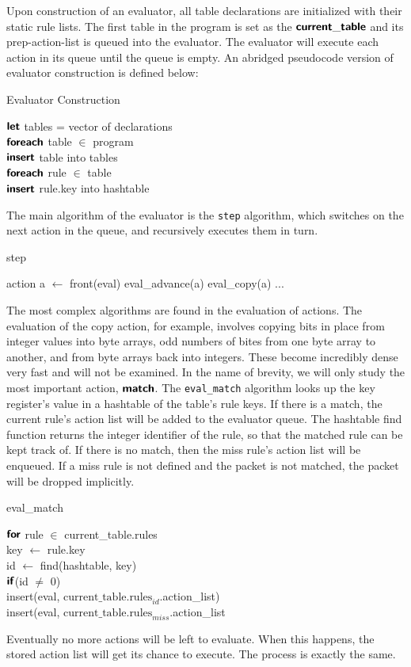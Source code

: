 Upon construction of an evaluator, all table declarations are initialized with their static rule lists. The first table in the program is set as the $\bm{\mathsf{{current\_table}}}$ and its prep-action-list is queued into the evaluator. The evaluator will execute each action in its queue until the queue is empty. An abridged pseudocode version of evaluator construction is defined below:
\begin{algorithm*}
\caption{Evaluator Construction}
$\bm{\mathsf{{let}}}$ tables = vector of declarations \\
$\bm{\mathsf{{foreach}}}$ table $\in$ program \\
\tab $\bm{\mathsf{{insert}}}$ table into tables \\
\tab $\bm{\mathsf{{foreach}}}$ rule $\in$ table \\
\tab\tab $\bm{\mathsf{{insert}}}$ rule.key into hashtable \\
\end{algorithm*}

The main algorithm of the evaluator is the \texttt{step} algorithm, which switches on the next action in the queue, and recursively executes them in turn.
\begin{algorithm}
\caption{step}
\begin{algorithmic}
  \State action a $\leftarrow$ front(eval)
    \Return eval\_advance(a)
    \Return eval\_copy(a)
  \EndIf
  \State ...
  \EndWhile
\end{algorithmic}
\end{algorithm}

The most complex algorithms are found in the evaluation of actions. The evaluation of the copy action, for example, involves copying bits in place from integer values into byte arrays, odd numbers of bites from one byte array to another, and from byte arrays back into integers. These become incredibly dense very fast and will not be examined. In the name of brevity, we will only study the most important action, $\bm{\mathsf{{match}}}$. The \texttt{eval\_match} algorithm looks up the key register's value in a hashtable of the table's rule keys. If there is a match, the current rule's action list will be added to the evaluator queue. The hashtable find function returns the integer identifier of the rule, so that the matched rule can be kept track of. If there is no match, then the miss rule's action list will be enqueued. If a miss rule is not defined and the packet is not matched, the packet will be dropped implicitly.
\begin{algorithm}
\caption{eval\_match}
$\bm{\mathsf{{for}}}$ rule $\in$ current\_table.rules\\
\tab key $\leftarrow$ rule.key\\
\tab id $\leftarrow$ find(hashtable, key)\\
\tab $\bm{\mathsf{{if}}}$(id $\neq$ 0)\\
\tab\tab insert(eval, $\textrm{current\_table.rules}_{id}$.action\_list)\\
insert(eval, $\textrm{current\_table.rules}_{miss}$.action\_list
\end{algorithm}

Eventually no more actions will be left to evaluate. When this happens, the stored action list will get its chance to execute. The process is exactly the same.

